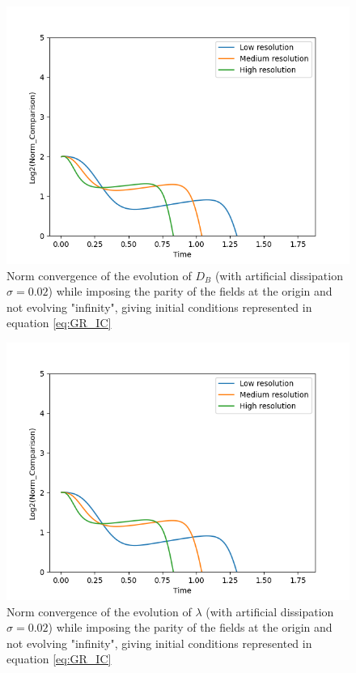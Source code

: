 \begin{figure}[H]
    \centering
    \includegraphics[width=0.9\columnwidth]{Images/DB-norm.png}
    \caption{Norm convergence of the evolution of $D_B$ (with artificial dissipation $\sigma = 0.02$) while imposing the parity of the fields at the origin and not evolving "infinity", giving initial conditions represented in equation \ref{eq:GR_IC}}
    \label{fig:norm_DB}
\end{figure}

\newpage

\begin{figure}[H]
    \centering
    \includegraphics[width=0.9\columnwidth]{Images/lambda-norm.png}
    \caption{Norm convergence of the evolution of $\lambda$ (with artificial dissipation $\sigma = 0.02$) while imposing the parity of the fields at the origin and not evolving "infinity", giving initial conditions represented in equation \ref{eq:GR_IC}}
    \label{fig:norm_lambda}
\end{figure}

